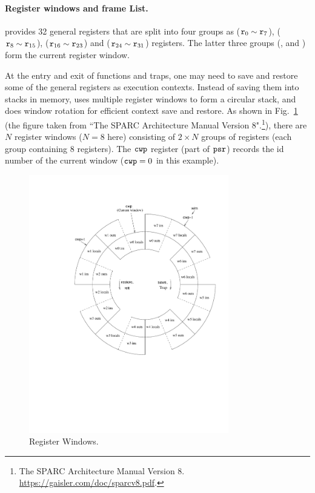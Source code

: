 \paragraph{\textbf{Register windows and frame List.}}
\sparc{} provides 32 general registers that are split into
four groups
as \globalRN{} ($\texttt{r}_{0} \sim \texttt{r}_{7}$),
\outRN{} ($\texttt{r}_{8} \sim \texttt{r}_{15}$), \localRN ($\texttt{r}_{16} \sim \texttt{r}_{23}$)
and \inRN{} ($\texttt{r}_{24} \sim \texttt{r}_{31}$) registers.
The latter three groups (\outRN{}, \localRN{} and \inRN{})
form the current register window.

At the entry and exit of functions and traps, one may need to
save and restore some of the general registers as execution
contexts. Instead of saving them into stacks in memory,
\sparc{} uses multiple register windows to form a circular
stack, and does window rotation for efficient context save and restore.
As shown in Fig.~\ref{fig:RegisterWindows}
(the figure taken from ``The SPARC Architecture Manual Version 8".\footnote{The SPARC Architecture Manual Version 8. 
\url{https://gaisler.com/doc/sparcv8.pdf}.}), 
there are $N$
register windows ($N=8$ here) consisting of $2\times N$
groups of registers (each group containing 8 registers).
The $\texttt{cwp}$ register (part of $\texttt{psr}$) records the id number
of the current window ($\texttt{cwp}=0$ in this example).
\begin{figure}[!t]
	\centering
	\includegraphics[width=8.7cm]{window}
	\caption{Register Windows.}
	\label{fig:RegisterWindows}
\end{figure}

